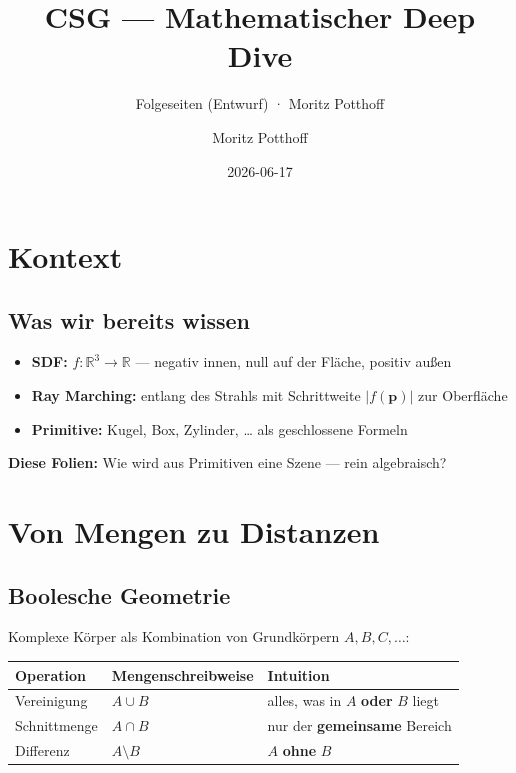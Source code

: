 \documentclass[
  ngerman,
]{article}
\title{CSG --- Mathematischer Deep Dive}
\subtitle{Folgeseiten (Entwurf) · Moritz Potthoff}
\author{Moritz Potthoff}
\date{2026-06-17}
\newcounter{none} %
\providecommand{\tightlist}{%
  \setlength{\itemsep}{0pt}\setlength{\parskip}{0pt}}
\begin{document}
\maketitle


\section{Kontext}\label{kontext}

\subsection{Was wir bereits wissen}\label{was-wir-bereits-wissen}

\begin{itemize}
\tightlist
\item
  \textbf{SDF:} \(f:\mathbb{R}^3\to\mathbb{R}\) --- negativ innen, null
  auf der Fläche, positiv außen
\item
  \textbf{Ray Marching:} entlang des Strahls mit Schrittweite
  \(|f(\mathbf{p})|\) zur Oberfläche
\item
  \textbf{Primitive:} Kugel, Box, Zylinder, \ldots{} als geschlossene
  Formeln
\end{itemize}

\vspace{0.6em}

\textbf{Diese Folien:} Wie wird aus Primitiven eine Szene --- rein
algebraisch?

\section{Von Mengen zu Distanzen}\label{von-mengen-zu-distanzen}

\subsection{Boolesche Geometrie}\label{boolesche-geometrie}

Komplexe Körper als Kombination von Grundkörpern \(A, B, C, \ldots\):

{\def\LTcaptype{none} %
\begin{longtable}[]{@{}lll@{}}
\toprule\noalign{}
Operation & Mengenschreibweise & Intuition \\
\midrule\noalign{}
\endhead
\bottomrule\noalign{}
\endlastfoot
Vereinigung & \(A \cup B\) & alles, was in \(A\) \textbf{oder} \(B\)
liegt \\
Schnittmenge & \(A \cap B\) & nur der \textbf{gemeinsame} Bereich \\
Differenz & \(A \setminus B\) & \(A\) \textbf{ohne} \(B\) \\
\end{longtable}
}
\end{document}

